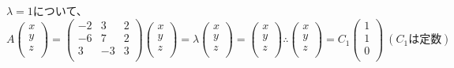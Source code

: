 \documentclass[]{jsarticle}
\begin{document}
        $\lambda = 1$について、
            \begin{equation*}
                A\begin{pmatrix}
                    x \\
                    y \\
                    z \\
                \end{pmatrix} =
                \begin{pmatrix}
                    -2 & 3 & 2 \\
                    -6 & 7 & 2 \\
                    3 & -3 & 3 \\
                \end{pmatrix}
                \begin{pmatrix}
                    x \\
                    y \\
                    z \\
                \end{pmatrix} =
                \lambda
                \begin{pmatrix}
                    x \\
                    y \\
                    z \\
                \end{pmatrix} =
                \begin{pmatrix}
                    x \\
                    y \\
                    z \\
                \end{pmatrix}
                \therefore
                \begin{pmatrix}
                    x \\
                    y \\
                    z \\
                \end{pmatrix} =
                C_1\begin{pmatrix}
                    1 \\
                    1 \\
                    0 \\
                \end{pmatrix} \
                (C_1は定数)
            \end{equation*}
\end{document}
